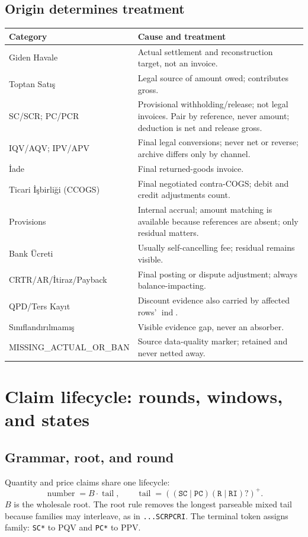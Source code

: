 \documentclass[11pt,a4paper]{article}
\newcommand{\ind}{\operatorname{ind}}
\theoremstyle{definition}
\begin{document}
\subsection{Origin determines treatment}
\begin{longtable}{@{}p{}p{}@{}}
\toprule
\textbf{Category} & \textbf{Cause and treatment}\\
\midrule
\endhead
Giden Havale & Actual settlement and reconstruction target, not an invoice.\\
Toptan Satış & Legal source of amount owed; contributes gross.\\
SC/SCR; PC/PCR & Provisional withholding/release; not legal invoices. Pair by reference, never amount; deduction is net and release gross.\\
IQV/AQV; IPV/APV & Final legal conversions; never net or reverse; archive differs only by channel.\\
İade & Final returned-goods invoice.\\
Ticari İşbirliği (CCOGS) & Final negotiated contra-COGS; debit and credit adjustments count.\\
Provisions & Internal accrual; amount matching is available because references are absent; only residual matters.\\
Bank Ücreti & Usually self-cancelling fee; residual remains visible.\\
CRTR/AR/İtiraz/Payback & Final posting or dispute adjustment; always balance-impacting.\\
QPD/Ters Kayıt & Discount evidence also carried by affected rows' $\ind$.\\
Sınıflandırılmamış & Visible evidence gap, never an absorber.\\
MISSING\_ACTUAL\_OR\_BAN & Source data-quality marker; retained and never netted away.\\
\bottomrule
\end{longtable}
\section{Claim lifecycle: rounds, windows, and states}
\subsection{Grammar, root, and round}
Quantity and price claims share one lifecycle:
\[
\operatorname{number}=B\cdot\operatorname{tail},\qquad
\operatorname{tail}=((\mathtt{SC}\mid\mathtt{PC})
(\mathtt{R}\mid\mathtt{RI})?)^+.
\]
$B$ is the wholesale root. The root rule removes the longest parseable
mixed tail because families may interleave, as in \texttt{...SCRPCRI}.
The terminal token assigns family: \texttt{SC*} to PQV and \texttt{PC*}
to PPV.
\end{document}
